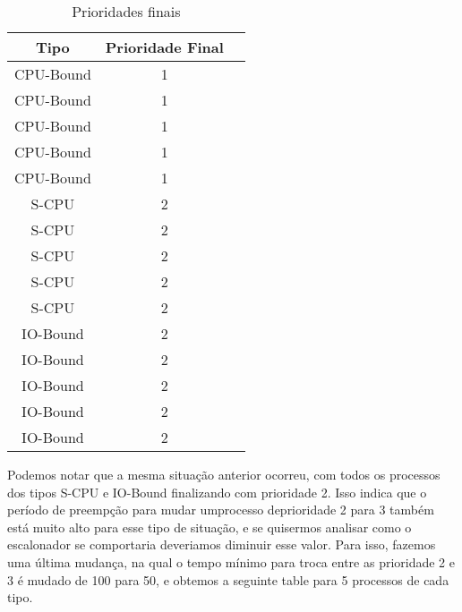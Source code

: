 \documentclass{article}
\begin{document}
\begin{table}[H]
      \centering
      \begin{tabular}{|c|c|c|}
            \hline
            \textbf{Tipo} & \textbf{Prioridade Final} \\
            \hline
            CPU-Bound     & 1                         \\
            CPU-Bound     & 1                         \\
            CPU-Bound     & 1                         \\
            CPU-Bound     & 1                         \\
            CPU-Bound     & 1                         \\
            S-CPU         & 2                         \\
            S-CPU         & 2                         \\
            S-CPU         & 2                         \\
            S-CPU         & 2                         \\
            S-CPU         & 2                         \\
            IO-Bound      & 2                         \\
            IO-Bound      & 2                         \\
            IO-Bound      & 2                         \\
            IO-Bound      & 2                         \\
            IO-Bound      & 2                         \\
            \hline
      \end{tabular}
      \caption{Prioridades finais}
\end{table}

Podemos notar que a mesma situação anterior ocorreu, com todos os processos dos
tipos S-CPU e IO-Bound finalizando com prioridade 2. Isso indica que o período
de preempção para mudar umprocesso deprioridade 2 para 3 também está muito alto
para esse tipo de situação, e se quisermos analisar como o escalonador se
comportaria deveriamos diminuir esse valor. Para isso, fazemos uma última
mudança, na qual o tempo mínimo para troca entre as prioridade 2 e 3 é mudado
de 100 para 50, e obtemos a seguinte table para 5 processos de cada tipo.
\end{document}
